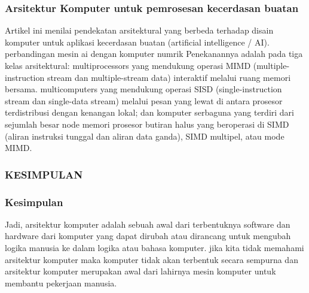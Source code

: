 	\subsubsection{Arsitektur Komputer untuk pemrosesan kecerdasan buatan}
	Artikel ini menilai pendekatan arsitektural yang berbeda terhadap disain komputer untuk aplikasi kecerdasan buatan (artificial intelligence / AI).
	perbandingan mesin ai dengan komputer numrik Penekanannya adalah pada tiga kelas arsitektural: multiprocessors yang mendukung operasi MIMD (multiple-instruction stream dan multiple-stream data) interaktif melalui ruang memori bersama.
	multicomputers yang mendukung operasi SISD (single-instruction stream dan single-data stream) melalui pesan yang lewat di antara prosesor terdistribusi dengan kenangan lokal; dan komputer serbaguna yang terdiri dari sejumlah besar node memori prosesor butiran halus yang beroperasi di SIMD (aliran instruksi tunggal dan aliran data ganda), SIMD multipel, atau mode MIMD.\cite{hwang1987computer}
	
	\subsubsection{KESIMPULAN}
	\subsubsection{Kesimpulan}
	Jadi, arsitektur komputer adalah sebuah awal dari terbentuknya software dan hardware dari komputer yang dapat dirubah atau dirancang untuk mengubah logika manusia ke dalam logika atau bahasa komputer.
	jika kita tidak memahami arsitektur komputer maka komputer tidak akan terbentuk secara sempurna dan arsitektur komputer merupakan awal dari lahirnya mesin komputer untuk membantu pekerjaan manusia.
	

